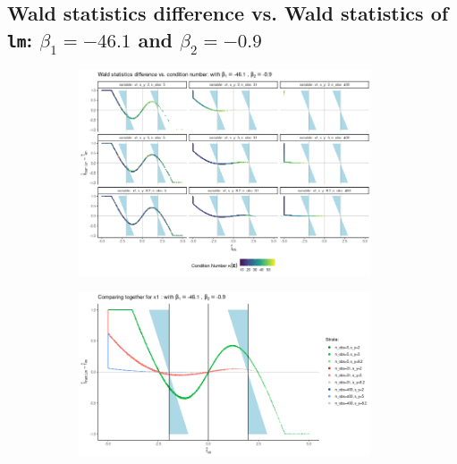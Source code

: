 \documentclass[11pt,a4paper,twoside]{book}\usepackage[]{graphicx}\usepackage[]{xcolor}
\begin{document}
\subsection{Wald statistics difference vs. Wald statistics of \texttt{lm}: $\beta_1=-46.1$ and $\beta_2=-0.9$}
\begin{figure}[H]
\begin{subfigure}[b]{1\textwidth}
\vspace*{-0.5cm}
\centering
\includegraphics[width=0.95\textwidth]{../fromsim/simdiffvswald111-1.png}
\end{subfigure}
\begin{subfigure}[b]{1\textwidth}
\vspace*{-0.3cm}
\centering
\includegraphics[width=0.95\textwidth]{../fromsim/simdiffvswald112-1.png}
\end{subfigure}
\vspace*{-0.9cm}

\end{figure}
\end{document}
